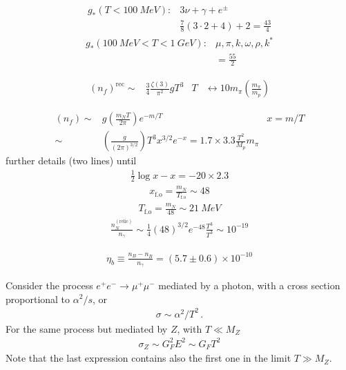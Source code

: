 \documentclass[12pt,letterpaper]{article}
\begin{document}
\begin{align}
  g_{*}(T<\SI{100}{MeV}):& 3\nu+\gamma+e^{\pm}\nonumber\\
&\frac{7}{8}(3\cdot 2+4)+2=\frac{43}{4}
\end{align}
\begin{align}
   g_{*}(\SI{100}{MeV}<T<\SI{1}{GeV}):& \mu,\pi,k,\omega,\rho,k^{*}\nonumber\\
    &=\frac{55}{2}
\end{align}

\begin{align}
  (n_{f})^{\text{rec}}\sim& \frac{3}{4}\frac{\zeta(3)}{\pi^2}g T^3&
T& \longleftrightarrow 10m_{\pi}\left( \frac{m_{\pi}}{m_p} \right)
\end{align}

\begin{align}
  (n_f)\sim& g \left( \frac{m_N T}{2\pi} \right)e^{-m/T} & x=m/T \nonumber\\
 \sim& \left( \frac{g}{(2\pi)^{3/2}} \right) T^3 x^{3/2}e^{-x}=1.7\times 3.3 \frac{T^{2}}{M_{p}}m_{\pi}
\end{align}
further details (two lines) until
\begin{align}
  \frac{1}{2}\log x-x=-20\times 2.3
\end{align}
\begin{align}
  x_{\text{f.o}}=\frac{m_N}{T_{\text{f.o}}}\sim 48
\end{align}
\begin{align}
  T_{\text{f.o}}=\frac{m_N}{48}\sim \SI{21}{MeV}
\end{align}
\begin{align}
  \frac{n_N^{(\text{relic})}}{n_{\gamma}}\sim \frac{1}{4}(48)^{3/2}e^{-48}
  \frac{T^3}{T^3}\sim 10^{-19}
\end{align}

\begin{align}
  \eta_{b}\equiv \frac{n_B-n_{\bar{B}}}{n_{\gamma}}=(5.7\pm 0.6)\times 10^{-10}
\end{align}


Consider the process $e^+e^-\to \mu^+\mu^-$ mediated by a photon, with a cross section proportional to $\alpha^2/s$, or
\begin{align}
  \sigma\sim \alpha^2/T^2\,.
\end{align}
For the same process but mediated by $Z$, with $T\ll  M_Z$
\begin{align}
  \sigma_Z\sim G_F^2 E^2\sim G_FT^2 
\end{align}
Note that the last expression contains also the first one in the limit $T\gg M_Z$.
\end{document}
